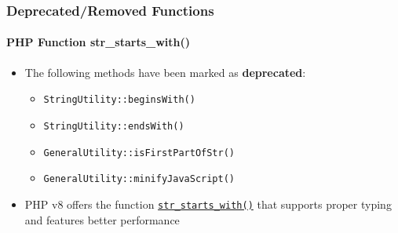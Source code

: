 %

\begin{frame}[fragile]
	\frametitle{Deprecated/Removed Functions}
	\framesubtitle{PHP Function {str\_starts\_with()}}


	\begin{itemize}
		\item The following methods have been marked as \textbf{deprecated}:
			\begin{itemize}
				\item \texttt{StringUtility::beginsWith()}
				\item \texttt{StringUtility::endsWith()}
			\end{itemize}
			\begin{itemize}
				\item \texttt{GeneralUtility::isFirstPartOfStr()}
				\item \texttt{GeneralUtility::minifyJavaScript()}
			\end{itemize}

		\item PHP v8 offers the function
			\href{https://www.php.net/manual/en/function.str-starts-with.php}{\texttt{str\_starts\_with()}}
			that supports proper typing and features better performance

	\end{itemize}

\end{frame}

